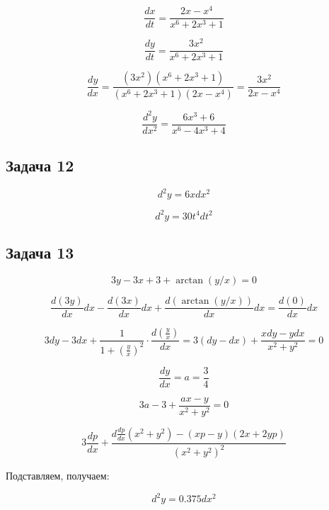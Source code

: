 \documentclass[a4paper,12pt]{article}
\begin{document}
\[
\frac{dx}{dt} = \frac{2x-x^4}{x^6+2x^3+1}
\]

\[
\frac{dy}{dt} = \frac{3x^2}{x^6+2x^3+1}
\]

\[
\frac{dy}{dx} = \frac{(3x^2)(x^6+2x^3+1)}{(x^6+2x^3+1)(2x-x^4)} = \frac{3x^2}{2x-x^4}
\]

\[
\frac{d^2y}{dx^2} = \frac{6x^3+6}{x^6-4x^3+4}
\]

\subsection{Задача 12}

\[
d^2y = 6xdx^2
\]

\[
d^2y = 30t^4dt^2
\]

\subsection{Задача 13}

\[
3y-3x+3+\arctan(y/x) = 0
\]

\[
\frac{d(3y)}{dx}dx - \frac{d(3x)}{dx}dx + \frac{d(\arctan(y/x))}{dx}dx = \frac{d(0)}{dx}dx
\]

\[
3dy - 3dx + \frac{1}{1+(\frac{y}{x})^2}\cdot \frac{d(\frac{y}{x})}{dx} = 3(dy-dx) + \frac{xdy-ydx}{x^2+y^2} = 0
\]

\[
\frac{dy}{dx} = a = \frac{3}{4}
\]

\[
3a-3+\frac{ax-y}{x^2+y^2} = 0
\]

\[
3\frac{dp}{dx} + \frac{d\frac{dp}{dx}(x^2+y^2)-(xp-y)(2x+2yp)}{(x^2+y^2)^2}
\]

Подставляем, получаем:

\[
d^2y = 0.375dx^2
\]
\end{document}
